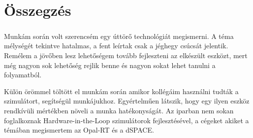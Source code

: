 \chapter{Összegzés}

\paragraph{}
Munkám során volt szerencsém egy úttörő technológiát megismerni. A téma mélységét tekintve hatalmas, a fent leírtak csak a jéghegy csúcsát jelentik. Remélem a jövőben lesz lehetőségem tovább fejleszteni az elkészült eszközt, mert még nagyon sok lehetőség rejlik benne és nagyon sokat lehet tanulni a folyamatból.

Külön örömmel töltött el munkám során amikor kollégáim használni tudták a szimulátort, segítségül munkájukhoz. Egyértelműen látszik, hogy egy ilyen eszköz rendkívüli mértékben növeli a munka hatékonyságát. Az iparban nem sokan foglalkoznak Hardware-in-the-Loop szimulátorok fejlesztésével, a cégeket akiket a témában megismertem az Opal-RT és a dSPACE.

